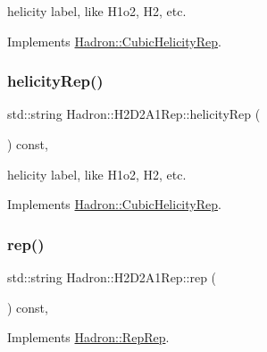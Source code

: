 helicity label, like H1o2, H2, etc. 

Implements \mbox{\hyperlink{structHadron_1_1CubicHelicityRep_af1096946b7470edf0a55451cc662f231}{Hadron\+::\+Cubic\+Helicity\+Rep}}.

\mbox{\label{structHadron_1_1H2D2A1Rep_a53e9f8aa22d8ccbeb585c9cf56440392}} 
\subsubsection{\texorpdfstring{helicityRep()}{helicityRep()}\hspace{0.1cm}{\footnotesize\ttfamily [3/3]}}
{\footnotesize\ttfamily std\+::string Hadron\+::\+H2\+D2\+A1\+Rep\+::helicity\+Rep (\begin{DoxyParamCaption}{ }\end{DoxyParamCaption}) const\hspace{0.3cm}{\ttfamily [inline]}, {\ttfamily [virtual]}}

helicity label, like H1o2, H2, etc. 

Implements \mbox{\hyperlink{structHadron_1_1CubicHelicityRep_af1096946b7470edf0a55451cc662f231}{Hadron\+::\+Cubic\+Helicity\+Rep}}.

\mbox{\label{structHadron_1_1H2D2A1Rep_a3280d932c7c579f85dedbde3a8e0f36f}} 
\subsubsection{\texorpdfstring{rep()}{rep()}\hspace{0.1cm}{\footnotesize\ttfamily [1/5]}}
{\footnotesize\ttfamily std\+::string Hadron\+::\+H2\+D2\+A1\+Rep\+::rep (\begin{DoxyParamCaption}{ }\end{DoxyParamCaption}) const\hspace{0.3cm}{\ttfamily [inline]}, {\ttfamily [virtual]}}



Implements \mbox{\hyperlink{structHadron_1_1RepRep_ab3213025f6de249f7095892109575fde}{Hadron\+::\+Rep\+Rep}}.

\mbox{\label{structHadron_1_1H2D2A1Rep_a3280d932c7c579f85dedbde3a8e0f36f}} 
